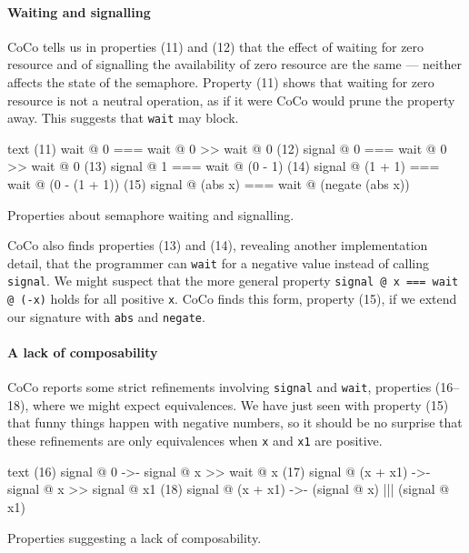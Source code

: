 \paragraph{Waiting and signalling}
CoCo tells us in properties (11) and (12) that the effect of waiting
for zero resource and of signalling the availability of zero resource
are the same --- neither affects the state of the semaphore.  Property
(11) shows that waiting for zero resource is not a neutral operation,
as if it were CoCo would prune the property away.  This suggests that
\verb|wait| may block.

\begin{listing}
\centering
\begin{cminted}{text}
(11)          wait @ 0  ===  wait @ 0 >> wait @ 0
(12)        signal @ 0  ===  wait @ 0 >> wait @ 0
(13)        signal @ 1  ===  wait @ (0 - 1)
(14)  signal @ (1 + 1)  ===  wait @ (0 - (1 + 1))
(15)  signal @ (abs x)  ===  wait @ (negate (abs x))
\end{cminted}
\caption{Properties about semaphore waiting and signalling.}\label{lst:sem2}
\end{listing}

CoCo also finds properties (13) and (14), revealing another
implementation detail, that the programmer can \verb|wait| for a
negative value instead of calling \verb|signal|.  We might suspect
that the more general property \verb|signal @ x === wait @ (-x)| holds
for all positive \verb|x|.  CoCo finds this form, property (15), if we
extend our signature with \verb|abs| and \verb|negate|.

\paragraph{A lack of composability}
CoCo reports some strict refinements involving \verb|signal| and
\verb|wait|, properties (16--18), where we might expect equivalences.
We have just seen with property (15) that funny things happen with
negative numbers, so it should be no surprise that these refinements
are only equivalences when \verb|x| and \verb|x1| are positive.

\begin{listing}
\centering
\begin{cminted}{text}
(16)         signal @ 0  ->-  signal @ x >> wait @ x
(17)  signal @ (x + x1)  ->-  signal @ x >> signal @ x1
(18)  signal @ (x + x1)  ->-  (signal @ x) ||| (signal @ x1)
\end{cminted}
\caption{Properties suggesting a lack of composability.}\label{lst:sem3}
\end{listing}

